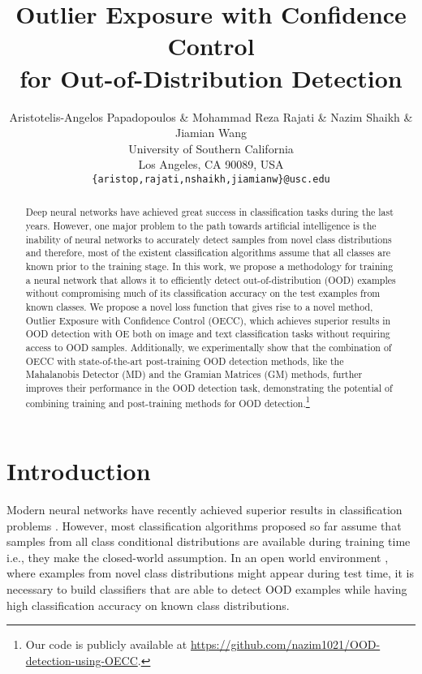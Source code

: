 \documentclass{article} \usepackage{iclr2020_conference,times}
\title{Outlier Exposure with Confidence Control \\ for Out-of-Distribution Detection}
\author{Aristotelis-Angelos Papadopoulos \& Mohammad Reza Rajati \& Nazim Shaikh \& Jiamian Wang\\
University of Southern California\\
Los Angeles, CA 90089, USA \\
\texttt{\{aristop,rajati,nshaikh,jiamianw\}@usc.edu} \\
}
\begin{document}
\maketitle

\begin{abstract}
Deep neural networks have achieved great success in classification tasks during the last years. However, one major problem to the path towards artificial intelligence is the inability of neural networks to accurately detect samples from novel class distributions and therefore, most of the existent classification algorithms assume that all classes are known prior to the training stage. In this work, we propose a methodology for training a neural network that allows it to efficiently detect out-of-distribution (OOD) examples without compromising much of its classification accuracy on the test examples from known classes. We propose a novel loss function that gives rise to a novel method, Outlier Exposure with Confidence Control (OECC), which achieves superior results in OOD detection with OE both on image and text classification tasks without requiring access to OOD samples. Additionally, we experimentally show that the combination of OECC with state-of-the-art post-training OOD detection methods, like the Mahalanobis Detector (MD) and the Gramian Matrices (GM) methods, further improves their performance in the OOD detection task, demonstrating the potential of combining training and post-training methods for OOD detection.\footnote{Our code is publicly available at \href{https://github.com/nazim1021/OOD-detection-using-OECC}{https://github.com/nazim1021/OOD-detection-using-OECC}.}
\end{abstract}

\section{Introduction}
Modern neural networks have recently achieved superior results in classification problems \citep{NIPS2012_4824, DBLP:journals/corr/HeZRS15}. However, most classification algorithms proposed so far assume that samples from all class conditional distributions are available during training time i.e., they make the closed-world assumption. In an open world environment \citep{Bendale_2015_CVPR}, where examples from novel class distributions might appear during test time, it is necessary to build classifiers that are able to detect OOD examples while having high classification accuracy on known class distributions.
\end{document}
